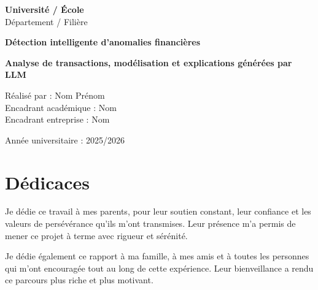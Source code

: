 \documentclass[12pt,a4paper,twoside]{report}
\begin{document}

\begin{titlepage}
\centering

\vspace{1.5cm}

{\large \textbf{Université / École}}\\[0.4cm]
{\large Département / Filière}

\vspace{2cm}

{\fontsize{24}{28}\selectfont \textbf{Détection intelligente d'anomalies financières}}

\vspace{0.5cm}

{\large \textbf{Analyse de transactions, modélisation et explications générées par LLM}}

\vspace{2cm}

{\large Réalisé par : Nom Prénom}\\[0.2cm]
{\large Encadrant académique : Nom}\\[0.2cm]
{\large Encadrant entreprise : Nom}

\vfill

{\large Année universitaire : 2025/2026}

\end{titlepage}

\clearpage
{}

\chapter*{Dédicaces}

Je dédie ce travail à mes parents, pour leur soutien constant, leur confiance et les valeurs de persévérance qu'ils m'ont transmises. Leur présence m'a permis de mener ce projet à terme avec rigueur et sérénité.

Je dédie également ce rapport à ma famille, à mes amis et à toutes les personnes qui m'ont encouragée tout au long de cette expérience. Leur bienveillance a rendu ce parcours plus riche et plus motivant.

\newpage

\end{document}
